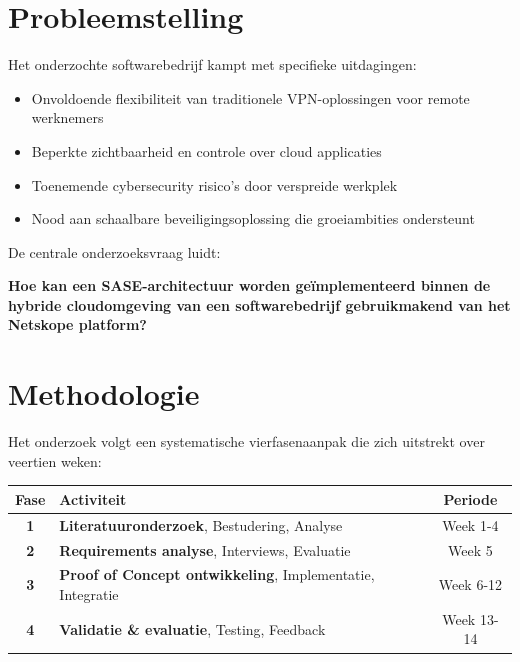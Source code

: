 \documentclass[a0,portrait]{hogent-poster}
\begin{document}
\begin{multicols}{2} %

\section{Probleemstelling}
Het onderzochte softwarebedrijf kampt met specifieke uitdagingen:

\begin{itemize}
\item Onvoldoende flexibiliteit van traditionele VPN-oplossingen voor remote werknemers
\item Beperkte zichtbaarheid en controle over cloud applicaties
\item Toenemende cybersecurity risico's door verspreide werkplek
\item Nood aan schaalbare beveiligingsoplossing die groeiambities ondersteunt
\end{itemize}

\vspace{1ex}

De centrale onderzoeksvraag luidt: 

\vspace{1ex}

\textbf{Hoe kan een SASE-architectuur worden geïmplementeerd binnen de hybride cloudomgeving van een softwarebedrijf gebruikmakend van het Netskope platform?}

\section{Methodologie}

Het onderzoek volgt een systematische vierfasenaanpak die zich uitstrekt over veertien weken:
\begin{center}
\renewcommand{\arraystretch}{1.7}
\begin{tabular}{|c|p{26cm}|c|}
\hline
\rowcolor{gray!20}
\textbf{Fase} & \textbf{Activiteit} & \textbf{Periode} \\
\hline
\rowcolor{blue!15}
\textbf{1} & \textbf{Literatuuronderzoek}, Bestudering, Analyse & Week 1-4 \\
\hline
\rowcolor{green!15}
\textbf{2} & \textbf{Requirements analyse}, Interviews, Evaluatie & Week 5 \\
\hline
\rowcolor{orange!15}
\textbf{3} & \textbf{Proof of Concept ontwikkeling}, Implementatie, Integratie & Week 6-12 \\
\hline
\rowcolor{red!15}
\textbf{4} & \textbf{Validatie \& evaluatie}, Testing, Feedback & Week 13-14 \\
\hline
\end{tabular}
\end{center}


\end{multicols}
\end{document}
